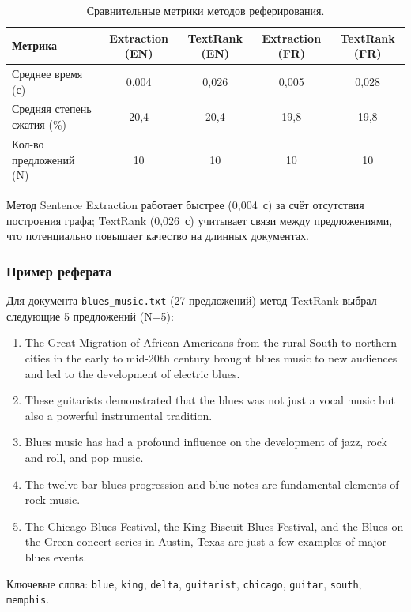 \begin{table}[H]
	\centering
	\begin{tabular}{|p{4cm}|c|c|c|c|}
		\hline
		\textbf{Метрика} & \textbf{Extraction (EN)} & \textbf{TextRank (EN)} & \textbf{Extraction (FR)} & \textbf{TextRank (FR)} \\
		\hline
		Среднее время (с) & 0,004 & 0,026 & 0,005 & 0,028 \\
		\hline
		Средняя степень сжатия (\%) & 20,4 & 20,4 & 19,8 & 19,8 \\
		\hline
		Кол-во предложений (N) & 10 & 10 & 10 & 10 \\
		\hline
	\end{tabular}
	\caption{Сравнительные метрики методов реферирования.}
	\label{tab:summary_methods}
\end{table}

Метод Sentence Extraction работает быстрее (0,004~с) за счёт отсутствия
построения графа; TextRank (0,026~с) учитывает связи между предложениями,
что потенциально повышает качество на длинных документах.

\subsubsection{Пример реферата}

Для документа \texttt{blues\_music.txt} (27 предложений) метод TextRank
выбрал следующие 5 предложений (N=5):

\begin{enumerate}
	\item The Great Migration of African Americans from the rural South to northern cities in the early to mid-20th century brought blues music to new audiences and led to the development of electric blues.
	\item These guitarists demonstrated that the blues was not just a vocal music but also a powerful instrumental tradition.
	\item Blues music has had a profound influence on the development of jazz, rock and roll, and pop music.
	\item The twelve-bar blues progression and blue notes are fundamental elements of rock music.
	\item The Chicago Blues Festival, the King Biscuit Blues Festival, and the Blues on the Green concert series in Austin, Texas are just a few examples of major blues events.
\end{enumerate}

Ключевые слова: \texttt{blue}, \texttt{king}, \texttt{delta}, \texttt{guitarist},
\texttt{chicago}, \texttt{guitar}, \texttt{south}, \texttt{memphis}.


